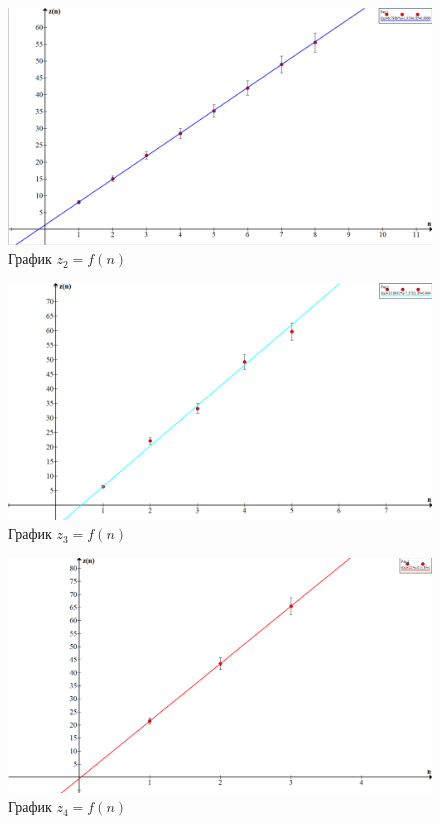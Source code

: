\documentclass[15pt,a5paper,reqno]{article}
\begin{document}
\begin{figure}[h!]
  \centering
  \includegraphics[width=13cm]{pics/lab_436_2.png}
  \caption{График $z_2 = f(n)$}
  \label{}
\end{figure}


\begin{figure}[h!]
  \centering
  \includegraphics[width=13cm]{pics/lab_436_3.png}
  \caption{График $z_3 = f(n)$}
  \label{}
\end{figure}


\begin{figure}[h!]
  \centering
  \includegraphics[width=13cm]{pics/lab_436_4.png}
  \caption{График $z_4 = f(n)$}
  \label{}
\end{figure}
\end{document}
